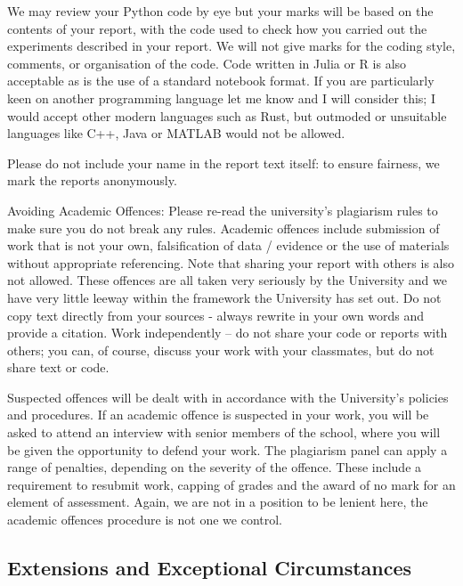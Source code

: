 \documentclass[12pt]{article}
\begin{document}
We may review your Python code by eye but your marks will be based on
the contents of your report, with the code used to check how you
carried out the experiments described in your report. We will not give
marks for the coding style, comments, or organisation of the
code. Code written in Julia or R is also acceptable as is the use of a
standard notebook format. If you are particularly keen on another
programming language let me know and I will consider this; I would
accept other modern languages such as Rust, but outmoded or unsuitable
languages like C++, Java or MATLAB would not be allowed.

Please do not include your name in the report text itself: to ensure fairness, we mark the reports anonymously.

Avoiding Academic Offences: Please re-read the university's plagiarism
rules to make sure you do not break any rules. Academic offences
include submission of work that is not your own, falsification of data
/ evidence or the use of materials without appropriate
referencing. Note that sharing your report with others is also not
allowed. These offences are all taken very seriously by the University
and we have very little leeway within the framework the University has
set out. Do not copy text directly from your sources - always rewrite
in your own words and provide a citation. Work independently -- do not
share your code or reports with others; you can, of course, discuss
your work with your classmates, but do not share text or code.

Suspected offences will be dealt with in accordance with the
University's policies and procedures. If an academic offence is
suspected in your work, you will be asked to attend an interview with
senior members of the school, where you will be given the opportunity
to defend your work. The plagiarism panel can apply a range of
penalties, depending on the severity of the offence. These include a
requirement to resubmit work, capping of grades and the award of no
mark for an element of assessment. Again, we are not in a position to
be lenient here, the academic offences procedure is not one we control.

\subsection*{Extensions and Exceptional Circumstances}
\end{document}

